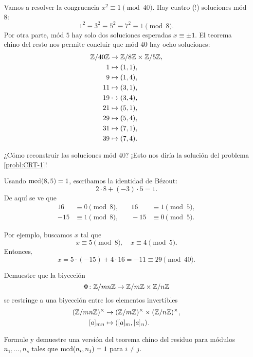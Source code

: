 \documentclass{article}
\begin{document}
\begin{ejemplo}
  Vamos a resolver la congruencia $x^2 \equiv 1 \pmod{40}$.
  Hay cuatro (!)  soluciones mód $8$:
  $$1^2 \equiv 3^2 \equiv 5^2 \equiv 7^2 \equiv 1 \pmod{8}.$$
  Por otra parte, mód $5$ hay solo dos soluciones esperadas $x \equiv \pm 1$.
  El teorema chino del resto nos permite concluir que mód $40$ hay ocho
  soluciones:
    \begin{align*}
      \mathbb{Z}/40\mathbb{Z} & \to \mathbb{Z}/8\mathbb{Z} \times \mathbb{Z}/5\mathbb{Z}, \\
      1 & \mapsto (1, 1), \\
      9 & \mapsto (1, 4), \\
      11 & \mapsto (3, 1), \\
      19 & \mapsto (3, 4), \\
      21 & \mapsto (5, 1), \\
      29 & \mapsto (5, 4), \\
      31 & \mapsto (7, 1), \\
      39 & \mapsto (7, 4).
    \end{align*}

  ¿Cómo reconstruir las soluciones mód $40$?
  ¡Esto nos diría la solución del problema \ref{probl:CRT-1}!

  Usando $\operatorname{mcd}(8,5) = 1$, escribamos la identidad de Bézout:
  $$2\cdot 8 + (-3)\cdot 5 = 1.$$
  De aquí se ve que
  \begin{align*}
    16 & \equiv 0 \pmod{8}, & \quad 16 & \equiv 1 \pmod{5}, \\
    -15 & \equiv 1 \pmod{8}, & \quad -15 & \equiv 0 \pmod{5}.
  \end{align*}

  Por ejemplo, buscamos $x$ tal que
  $$x \equiv 5 \pmod{8}, \quad x \equiv 4 \pmod{5}.$$
  Entonces,
  $$x = 5\cdot (-15) + 4\cdot 16 = -11 \equiv 29 \pmod{40}.$$
\end{ejemplo}

\begin{problema}
  \label{probl:crt-invertibles}
  Demuestre que la biyección
  $$\Phi\colon \mathbb{Z}/mn\mathbb{Z} \to \mathbb{Z}/m\mathbb{Z} \times \mathbb{Z}/n\mathbb{Z}$$
  se restringe a una biyección entre los elementos invertibles
  \begin{align*}
    (\mathbb{Z}/mn\mathbb{Z})^\times & \to (\mathbb{Z}/m\mathbb{Z})^\times \times (\mathbb{Z}/n\mathbb{Z})^\times, \\
    [a]_{mn} & \mapsto ([a]_m, [a]_n).
  \end{align*}
\end{problema}

\begin{problema}
  Formule y demuestre una versión del teorema chino del residuo para módulos
  $n_1, \ldots, n_s$ tales que $\operatorname{mcd} (n_i,n_j) = 1$ para $i \ne j$.
\end{problema}
\end{document}
